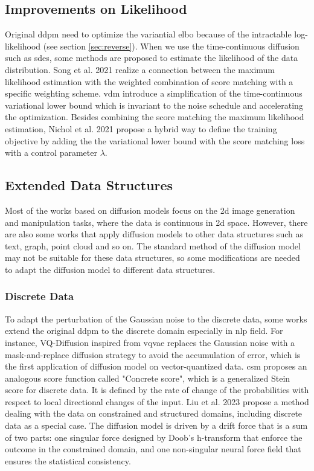 \documentclass[12pt,DIV14,BCOR12mm,a4paper,footinclude=false,headinclude,parskip=half-,twoside,openright,cleardoublepage=empty,toc=index,bibliography=totoc,listof=totoc]{scrreprt}
\numberwithin{equation}{chapter}
\begin{document}
\subsection{Improvements on Likelihood}
Original \gls{ddpm} need to optimize the variantial \gls{elbo} because of the intractable log-likelihood (see section \ref{sec:reverse}). When we use the time-continuous diffusion such as \glspl{sde}, some methods are proposed to estimate the likelihood of the data distribution. Song et al. 2021 \cite{song2021maximum} realize a connection between the maximum likelihood estimation with the weighted combination of score matching with a specific weighting scheme. \gls{vdm} \cite{kingma2023variational} introduce a simplification of the time-continuous variational lower bound which is invariant to the noise schedule and accelerating the optimization. Besides combining the score matching the maximum likelihood estimation, Nichol et al. 2021 \cite{nichol2021improved} propose a hybrid way to define the training objective by adding the the variational lower bound with the score matching loss with a control parameter $\lambda$.

\subsection{Extended Data Structures}
Most of the works based on diffusion models focus on the \gls{2d} image generation and manipulation tasks, where the data is continuous in \gls{2d} space. However, there are also some works that apply diffusion models to other data structures such as text, graph, point cloud and so on. The standard method of the diffusion model may not be suitable for these data structures, so some modifications are needed to adapt the diffusion model to different data structures.
\subsubsection{Discrete Data}
To adapt the perturbation of the Gaussian noise to the discrete data, some works extend the original \gls{ddpm} to the discrete domain especially in \gls{nlp} field. For instance, VQ-Diffusion \cite{gu2022vector} inspired from \gls{vqvae} \cite{oord2018neural} replaces the Gaussian noise with a mask-and-replace diffusion strategy to avoid the accumulation of error, which is the first application of diffusion model on vector-quantized data. \gls{csm} \cite{meng2023distillation} proposes an analogous score function called "Concrete score", which is a generalized Stein score for discrete data. It is defined by the rate of change of the probabilities with respect to local directional changes of the input. Liu et al. 2023 \cite{liu2023learning} propose a method dealing with the data on constrained and structured domains, including discrete data as a special case. The diffusion model is driven by a drift force that is a sum of two parts: one singular force designed by Doob's h-transform that enforce the outcome in the constrained domain, and one non-singular neural force field that ensures the statistical consistency.
\end{document}
